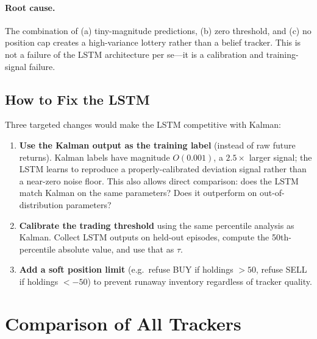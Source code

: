 \documentclass[11pt]{article}
\begin{document}
\paragraph{Root cause.}
The combination of (a) tiny-magnitude predictions, (b) zero threshold, and
(c) no position cap creates a high-variance lottery rather than a belief
tracker.
This is not a failure of the LSTM architecture per se---it is a calibration
and training-signal failure.

\subsection{How to Fix the LSTM}

Three targeted changes would make the LSTM competitive with Kalman:

\begin{enumerate}[leftmargin=1.5em]
  \item \textbf{Use the Kalman output as the training label} (instead of raw
    future returns). Kalman labels have magnitude $O(0.001)$, a $2.5\times$
    larger signal; the LSTM learns to reproduce a properly-calibrated
    deviation signal rather than a near-zero noise floor.
    This also allows direct comparison: does the LSTM match Kalman on the
    same parameters? Does it outperform on out-of-distribution parameters?

  \item \textbf{Calibrate the trading threshold} using the same percentile
    analysis as Kalman. Collect LSTM outputs on held-out episodes,
    compute the 50th-percentile absolute value, and use that as $\tau$.

  \item \textbf{Add a soft position limit} (e.g.\ refuse BUY if
    holdings $> 50$, refuse SELL if holdings $< -50$) to prevent
    runaway inventory regardless of tracker quality.
\end{enumerate}

\section{Comparison of All Trackers}
\end{document}

